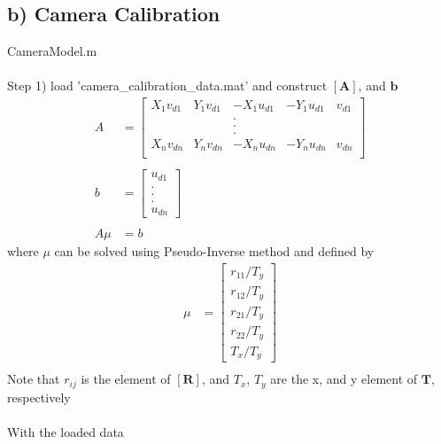 \documentclass[]{article}
\begin{document}
\subsection{b) Camera Calibration}
CameraModel.m\\
\\
Step 1) load 'camera\_calibration\_data.mat' and construct $[\textbf{A}]$, and $\textbf{b}$
\begin{align*}
A &=
\begin{bmatrix}
X_1v_{d1} & Y_1v_{d1} & -X_1u_{d1} & -Y_1u_{d1} & v_{d1}\\
 & & . & &\\
 & & . & &\\
 & & . & &\\
X_nv_{dn} & Y_nv_{dn} & -X_nu_{dn} & -Y_nu_{dn} & v_{dn}\\
\end{bmatrix}\\
\\
b &=
\begin{bmatrix}
u_{d1}\\
.\\
.\\
.\\
u_{dn}
\end{bmatrix}\\
\\
A\mu &= b
\end{align*}
\indent where $\mu$ can be solved using Pseudo-Inverse method and defined by
\begin{align*}
\mu &=
\begin{bmatrix}
r_{11}/T_y\\
r_{12}/T_y\\
r_{21}/T_y\\
r_{22}/T_y\\
T_x/T_y
\end{bmatrix}\\
\end{align*}
\indent Note that $r_{ij}$ is the element of $[\textbf{R}]$, and $T_x$, $T_y$ are the x, and y element of $\textbf{T}$, respectively\\
\\
\indent With the loaded data
\newpage
\end{document}
